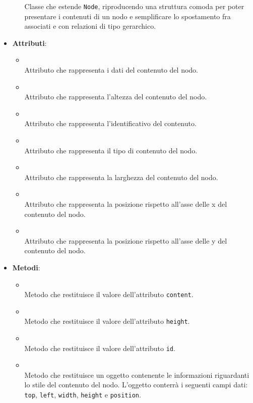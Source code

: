 \begin{itemize}
\begin{itemize}
Classe che estende \texttt{Node}, riproducendo una struttura comoda per poter presentare i contenuti di un nodo e semplificare lo spostamento fra  associati e con relazioni di tipo gerarchico.
\end{itemize}
\item \textbf{Attributi}:
\begin{itemize}
\item {}
\\ Attributo che rappresenta i dati del contenuto del nodo.
\item {}
\\ Attributo che rappresenta l'altezza del contenuto del nodo.
\item {}
\\ Attributo che rappresenta l'identificativo del contenuto.
\item {}
\\ Attributo che rappresenta il tipo di contenuto del nodo.
\item {}
\\ Attributo che rappresenta la larghezza del contenuto del nodo.
\item {}
\\ Attributo che rappresenta la posizione rispetto all'asse delle x del contenuto del nodo.
\item {}
\\ Attributo che rappresenta la posizione rispetto all'asse delle y del contenuto del nodo.
\end{itemize}
\item \textbf{Metodi}:
\begin{itemize}
\item {}
\\ Metodo che restituisce il valore dell'attributo \texttt{content}.
\item {}
\\ Metodo che restituisce il valore dell'attributo \texttt{height}.
\item {}
\\ Metodo che restituisce il valore dell'attributo \texttt{id}.
\item {}
\\ Metodo che restituisce un oggetto contenente le informazioni riguardanti lo stile  del contenuto del nodo. L'oggetto conterrà i seguenti campi dati: \texttt{top}, \texttt{left}, \texttt{width}, \texttt{height} e \texttt{position}.

\end{itemize}
\end{itemize}
